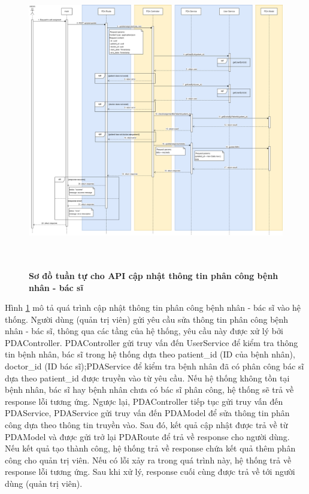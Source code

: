 \begin{figure}[H]
  \centering
  \includegraphics[width=16cm,height=13cm]{Images/sequence_api/editAssignment.png}
  \caption[Sơ đồ tuần tự cho API cập nhật thông tin phân công bệnh nhân - bác sĩ]{\bfseries \fontsize{12pt}{0pt}
  \selectfont Sơ đồ tuần tự cho API cập nhật thông tin phân công bệnh nhân - bác sĩ }
  \label{editPDA} %
\end{figure}
Hình \ref{editPDA} mô tả quá trình cập nhật thông tin phân công bệnh nhân - bác sĩ vào hệ thống. Người dùng (quản trị viên) gửi yêu cầu sửa thông tin phân công bệnh nhân - bác sĩ, thông qua các tầng của hệ thống, 
yêu cầu này được xử lý bởi PDAController. PDAController gửi truy vấn đến UserService để kiểm tra thông tin bệnh nhân, bác sĩ trong hệ thống dựa theo patient\_id (ID của bệnh nhân), doctor\_id (ID bác sĩ);PDAService để kiểm
tra bệnh nhân đã có phân công bác sĩ dựa theo patient\_id được truyền vào từ yêu cầu. Nếu hệ thống không tồn tại bệnh nhân, bác sĩ hay bệnh nhân chưa có bác sĩ phân công, hệ thống sẽ trả về response lỗi tương ứng. 
Ngược lại, PDAController tiếp tục gửi truy vấn đến PDAService, PDAService gửi truy vấn đến PDAModel để sửa thông tin phân công dựa theo thông tin truyền vào. Sau đó, kết quả cập nhật được trả về từ PDAModel và được gửi trở lại 
PDARoute để trả về response cho người dùng. Nếu kết quả tạo thành công, hệ thống trả về response chứa kết quả thêm phân công cho quản trị viên. 
Nếu có lỗi xảy ra trong quá trình này, hệ thống trả về response lỗi tương ứng. Sau khi xử lý, response cuối cùng được trả về tới người dùng (quản trị viên).

